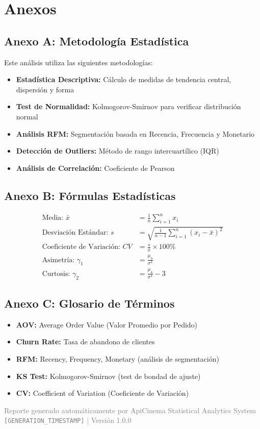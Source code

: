 \documentclass[12pt,a4paper]{article}
\begin{document}
\newpage
\section*{\textcolor{primaryblue}{Anexos}}

\subsection*{Anexo A: Metodología Estadística}

Este análisis utiliza las siguientes metodologías:

\begin{itemize}
    \item \textbf{Estadística Descriptiva:} Cálculo de medidas de tendencia central, dispersión y forma
    \item \textbf{Test de Normalidad:} Kolmogorov-Smirnov para verificar distribución normal
    \item \textbf{Análisis RFM:} Segmentación basada en Recencia, Frecuencia y Monetario
    \item \textbf{Detección de Outliers:} Método de rango intercuartílico (IQR)
    \item \textbf{Análisis de Correlación:} Coeficiente de Pearson
\end{itemize}

\subsection*{Anexo B: Fórmulas Estadísticas}

\begin{align}
\text{Media: } \bar{x} &= \frac{1}{n}\sum_{i=1}^{n} x_i \\
\text{Desviación Estándar: } s &= \sqrt{\frac{1}{n-1}\sum_{i=1}^{n} (x_i - \bar{x})^2} \\
\text{Coeficiente de Variación: } CV &= \frac{s}{\bar{x}} \times 100\% \\
\text{Asimetría: } \gamma_1 &= \frac{\mu_3}{\sigma^3} \\
\text{Curtosis: } \gamma_2 &= \frac{\mu_4}{\sigma^4} - 3
\end{align}

\subsection*{Anexo C: Glosario de Términos}

\begin{itemize}
    \item \textbf{AOV:} Average Order Value (Valor Promedio por Pedido)
    \item \textbf{Churn Rate:} Tasa de abandono de clientes
    \item \textbf{RFM:} Recency, Frequency, Monetary (análisis de segmentación)
    \item \textbf{KS Test:} Kolmogorov-Smirnov (test de bondad de ajuste)
    \item \textbf{CV:} Coefficient of Variation (Coeficiente de Variación)
\end{itemize}

\vfill
\begin{center}
\textcolor{gray}{\small
Reporte generado automáticamente por ApiCinema Statistical Analytics System \\
\texttt{[GENERATION\_TIMESTAMP]} | Versión 1.0.0
}
\end{center}
\end{document}
